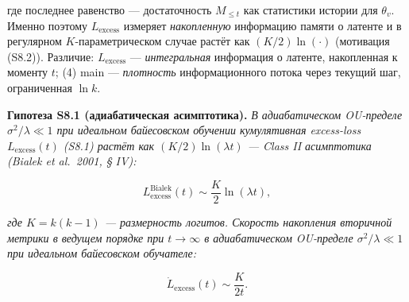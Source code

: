 \documentclass[pdflatex,sn-mathphys-ay]{sn-jnl}
\begin{document}
где последнее равенство --- достаточность \(M_{\le t}\) как статистики истории для \(\theta_v\). Именно поэтому \(L_{\text{excess}}\) измеряет \emph{накопленную} информацию памяти о латенте и в регулярном \(K\)-параметрическом случае растёт как \((K/2)\ln(\cdot)\) (мотивация (S8.2)). Различие: \(L_{\text{excess}}\) --- \emph{интегральная} информация о латенте, накопленная к моменту \(t\); (4) main --- \emph{плотность} информационного потока через текущий шаг, ограниченная \(\ln k\).



\textbf{Гипотеза S8.1 (адиабатическая асимптотика).} \emph{В адиабатическом OU-пределе \(\sigma^2/\lambda \ll 1\) при идеальном байесовском обучении кумулятивная excess-loss \(L_{\text{excess}}(t)\) (S8.1) растёт как \((K/2)\ln(\lambda t)\) --- Class II асимптотика (Bialek et al.~2001, § IV):}



\begin{equation}L_{\text{excess}}^{\text{Bialek}}(t) \sim \frac{K}{2} \ln(\lambda t), \tag{S8.2}\end{equation}



\emph{где \(K = k(k-1)\) --- размерность логитов. Скорость накопления вторичной метрики в ведущем порядке при \(t \to \infty\) в адиабатическом OU-пределе \(\sigma^2/\lambda \ll 1\) при идеальном байесовском обучателе:}



\begin{equation}\dot{L}_{\text{excess}}(t) \sim \frac{K}{2 t}. \tag{S8.3}\end{equation}
\end{document}
